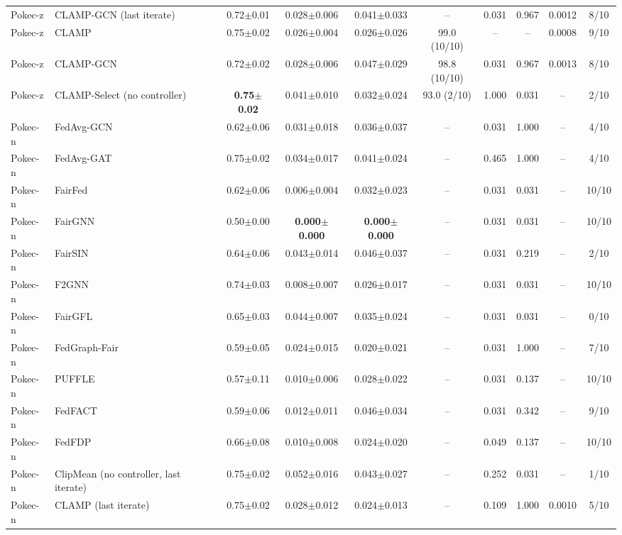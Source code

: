 \begin{table}[tbp]
{\begin{tabular}{llcccccccc}
Pokec-z & CLAMP-GCN (last iterate) & 0.72$\pm$0.01 & 0.028$\pm$0.006 & 0.041$\pm$0.033 & -- & 0.031 & 0.967 & 0.0012 & 8/10 \\
Pokec-z & CLAMP & 0.75$\pm$0.02 & 0.026$\pm$0.004 & 0.026$\pm$0.026 & 99.0 (10/10) & -- & -- & 0.0008 & 9/10 \\
Pokec-z & CLAMP-GCN & 0.72$\pm$0.02 & 0.028$\pm$0.006 & 0.047$\pm$0.029 & 98.8 (10/10) & 0.031 & 0.967 & 0.0013 & 8/10 \\
Pokec-z & CLAMP-Select (no controller) & \textbf{0.75$\pm$0.02} & 0.041$\pm$0.010 & 0.032$\pm$0.024 & 93.0 (2/10) & 1.000 & 0.031 & -- & 2/10 \\
Pokec-n & FedAvg-GCN & 0.62$\pm$0.06 & 0.031$\pm$0.018 & 0.036$\pm$0.037 & -- & 0.031 & 1.000 & -- & 4/10 \\
Pokec-n & FedAvg-GAT & 0.75$\pm$0.02 & 0.034$\pm$0.017 & 0.041$\pm$0.024 & -- & 0.465 & 1.000 & -- & 4/10 \\
Pokec-n & FairFed & 0.62$\pm$0.06 & 0.006$\pm$0.004 & 0.032$\pm$0.023 & -- & 0.031 & 0.031 & -- & 10/10 \\
Pokec-n & FairGNN & 0.50$\pm$0.00 & \textbf{0.000$\pm$0.000} & \textbf{0.000$\pm$0.000} & -- & 0.031 & 0.031 & -- & 10/10 \\
Pokec-n & FairSIN & 0.64$\pm$0.06 & 0.043$\pm$0.014 & 0.046$\pm$0.037 & -- & 0.031 & 0.219 & -- & 2/10 \\
Pokec-n & F2GNN & 0.74$\pm$0.03 & 0.008$\pm$0.007 & 0.026$\pm$0.017 & -- & 0.031 & 0.031 & -- & 10/10 \\
Pokec-n & FairGFL & 0.65$\pm$0.03 & 0.044$\pm$0.007 & 0.035$\pm$0.024 & -- & 0.031 & 0.031 & -- & 0/10 \\
Pokec-n & FedGraph-Fair & 0.59$\pm$0.05 & 0.024$\pm$0.015 & 0.020$\pm$0.021 & -- & 0.031 & 1.000 & -- & 7/10 \\
Pokec-n & PUFFLE & 0.57$\pm$0.11 & 0.010$\pm$0.006 & 0.028$\pm$0.022 & -- & 0.031 & 0.137 & -- & 10/10 \\
Pokec-n & FedFACT & 0.59$\pm$0.06 & 0.012$\pm$0.011 & 0.046$\pm$0.034 & -- & 0.031 & 0.342 & -- & 9/10 \\
Pokec-n & FedFDP & 0.66$\pm$0.08 & 0.010$\pm$0.008 & 0.024$\pm$0.020 & -- & 0.049 & 0.137 & -- & 10/10 \\
Pokec-n & ClipMean (no controller, last iterate) & 0.75$\pm$0.02 & 0.052$\pm$0.016 & 0.043$\pm$0.027 & -- & 0.252 & 0.031 & -- & 1/10 \\
Pokec-n & CLAMP (last iterate) & 0.75$\pm$0.02 & 0.028$\pm$0.012 & 0.024$\pm$0.013 & -- & 0.109 & 1.000 & 0.0010 & 5/10 \\

\end{tabular}}
\end{table}
